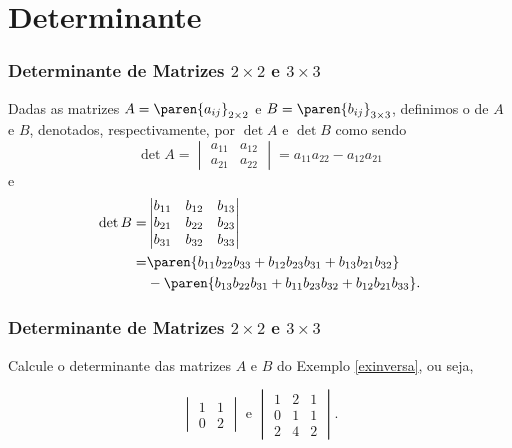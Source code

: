 \section{Determinante}


\begin{frame}
    \frametitle{Determinante de Matrizes $2 \times 2$ e $3 \times 3$}
    
    \begin{definicao}
        Dadas as matrizes  $ A = \paren{a_{ij}}_{2 \times 2}$ e $ B = \paren{b_{ij}}_{3 \times 3}$, definimos o  de $A$ e $B$, denotados, respectivamente, por $\det A$ e $\det B$ como sendo
        \begin{displaymath} \det A = 
            \begin{vmatrix}
                 a_{11} & a_{12} \\
                 a_{21} &  a_{22}
            \end{vmatrix} = a_{11}a_{22} - a_{12}a_{21}
        \end{displaymath}
        e
        \begin{align*}    \det B =&
            \begin{vmatrix}
                b_{11} & b_{12} & b_{13} \\
                b_{21} & b_{22} & b_{23} \\
                b_{31} & b_{32} & b_{33}
            \end{vmatrix} \\
            =& \paren{b_{11}b_{22}b_{33} + b_{12}b_{23}b_{31} + b_{13}b_{21}b_{32}} \\ 
            & - \paren{b_{13}b_{22}b_{31} + b_{11}b_{23}b_{32} + b_{12}b_{21}b_{33}}.
        \end{align*}
    \end{definicao}
\end{frame}


\begin{frame}
    \frametitle{Determinante de Matrizes $2 \times 2$ e $3 \times 3$}
    
    \begin{exemplo}
        Calcule o determinante das matrizes $A$ e $B$ do Exemplo \ref{exinversa}, ou seja,
        
        \begin{displaymath}  
            \begin{vmatrix}
                1 & 1  \\
                0 & 2
            \end{vmatrix}
        \text{ e }  
            \begin{vmatrix}
                1 & 2 & 1 \\
                0 & 1 & 1 \\
                2 & 4 & 2 
            \end{vmatrix}.
        \end{displaymath}
    \end{exemplo}

\end{frame}


